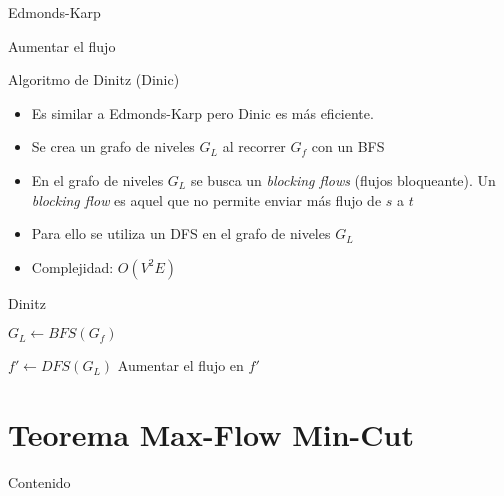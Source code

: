 \documentclass[]{beamer}
\begin{document}
\begin{frame}{Edmonds-Karp}
  \begin{algorithm}[H]
    {
      {Aumentar el flujo}
    }
  \end{algorithm}
\end{frame}

\begin{frame}{Algoritmo de Dinitz (Dinic)}
  \begin{itemize}
    \item Es similar a Edmonds-Karp pero Dinic es m\'as eficiente.
      \pause
    \item Se crea un grafo de niveles $G_L$ al recorrer $G_f$ con un BFS
      \pause
    \item En el grafo de niveles $G_L$ se busca un \textit{blocking flows} (flujos bloqueante). Un \textit{blocking flow} es aquel que no permite enviar m\'as flujo de $s$ a $t$
      \pause
    \item Para ello se utiliza un DFS en el grafo de niveles $G_L$
      \pause
    \item Complejidad: $O(V^2E)$
  \end{itemize}
\end{frame}

\begin{frame}{Dinitz}
  \begin{algorithm}[H]
    {
      {$G_L \gets BFS(G_f)$}

      {$f' \gets DFS(G_L)$} 
      {Aumentar el flujo en $f'$}

    }
  \end{algorithm}
\end{frame}


\section{Teorema Max-Flow Min-Cut}
\begin{frame}{Contenido}
\tableofcontents[currentsection]
\end{frame}
\end{document}

